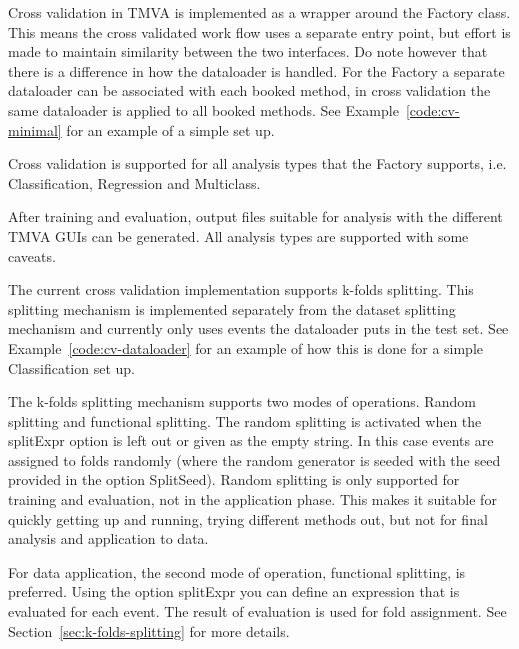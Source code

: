 Cross validation in TMVA is implemented as a wrapper around the Factory class. This means the cross validated work flow uses a separate entry point, but effort is made to maintain similarity between the two interfaces. Do note however that there is a difference in how the dataloader is handled. For the Factory a separate dataloader can be associated with each booked method, in cross validation the same dataloader is applied to all booked methods. See Example~\ref{code:cv-minimal} for an example of a simple set up.

Cross validation is supported for all analysis types that the Factory supports, i.e. Classification, Regression and Multiclass.

After training and evaluation, output files suitable for analysis with the different TMVA GUIs can be generated. All analysis types are supported with some caveats.

The current cross validation implementation supports k-folds splitting. This splitting mechanism is implemented separately from the dataset splitting mechanism and currently only uses events the dataloader puts in the test set. See Example~\ref{code:cv-dataloader} for an example of how this is done for a simple Classification set up.

The k-folds splitting mechanism supports two modes of operations. Random splitting and functional splitting. The random splitting is activated when the splitExpr option is left out or given as the empty string. In this case events are assigned to folds randomly (where the random generator is seeded with the seed provided in the option SplitSeed). Random splitting is only supported for training and evaluation, not in the application phase. This makes it suitable for quickly getting up and running, trying different methods out, but not for final analysis and application to data.

For data application, the second mode of operation, functional splitting, is preferred. Using the option splitExpr you can define an expression that is evaluated for each event. The result of evaluation is used for fold assignment. See Section~\ref{sec:k-folds-splitting} for more details.

